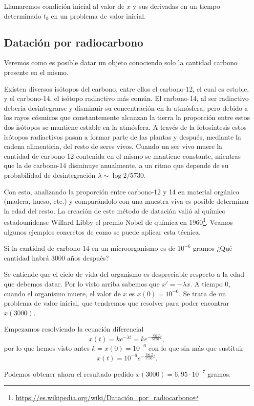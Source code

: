 \documentclass[../ecuaciones_diferenciales.tex]{subfiles}
\begin{document}
\begin{definition}
	Llamaremos condición inicial al valor de \(x\) y sus derivadas en un tiempo
	determinado \(t_0\) en un problema de valor inicial.
\end{definition}

\subsection{Datación por radiocarbono}

Veremos como es posible datar un objeto conociendo solo la cantidad carbono 
presente en el mismo.

Existen diversos isótopos del carbono, entre ellos el carbono-12, el cual es
estable, y el carbono-14, el isótopo radiactivo más común. El carbono-14, al ser
radiactivo debería desintegrarse y disminuir su concentración en la atmósfera,
pero debido a los rayos cósmicos que constantemente alcanzan la tierra la
proporción entre estos dos isótopos se mantiene estable en la atmósfera. A
través de la fotosíntesis estos isótopos radiactivos pasan a formar parte de las
plantas y después, mediante la cadena alimenticia, del resto de seres vivos.
Cuando un ser vivo muere la cantidad de carbono-12 contenida en el mismo se
mantiene constante, mientras que la de carbono-14 disminuye anualmente,
a un ritmo que depende de su probabilidad de desintegración
\(\lambda \sim \log 2 / 5730\).

Con esto, analizando la proporción entre carbono-12 y 14 en
material orgánico (madera, hueso, etc.) y comparándolo con una muestra viva es 
posible determinar la edad del resto. La creación de este método de
datación valió al químico estadounidense Willard Libby el premio Nobel de
química en
1960\footnote{\url{https://es.wikipedia.org/wiki/Datación_por_radiocarbono}}.
Veamos algunos ejemplos concretos de como se puede aplicar esta
técnica.

\begin{example}
	Si la cantidad de carbono-14 en un microorganismo es de \(10^{-6}\) gramos
	¿Qué cantidad habrá 3000 años después?
\end{example}

\begin{solution}
	Se entiende que el ciclo de vida del organismo es despreciable respecto a la
	edad que debemos datar. Por lo visto arriba sabemos que \(x' = -\lambda x\).
	A tiempo \(0\), cuando el organismo muere, el valor de \(x\) es
	\(x(0) = 10^{-6}\). Se trata de un problema de valor inicial, que tendremos
	que resolver para poder encontrar \(x(3000)\). 

	Empezamos resolviendo la ecuación diferencial
	\[x(t) = k e^{-\lambda t} = k e^{-\frac{\log 2}{5730} t},\]
	por lo que hemos visto antes \(k = x(0) = 10^{-6}\) con lo que sin más que
	sustituir
	\[x(t) = 10^{-6} e^{-\frac{\log 2}{5730} t}.\]

	Podemos obtener ahora el resultado pedido 
	\(x(3000) = 6,95 \cdot 10^{-7}\) gramos.
\end{solution}
\end{document}
